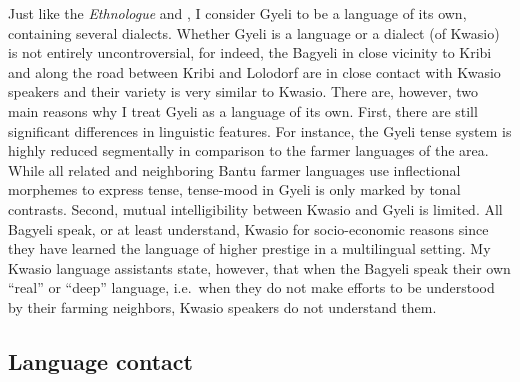 Just like the \textit{Ethnologue} and \citet{maho2009}, I consider Gyeli to be a language of its own, containing several dialects. Whether Gyeli is a language or a dialect (of Kwasio) is not entirely uncontroversial, for indeed, the Bagyeli in close vicinity to Kribi and along the road between Kribi and Lolodorf are in close contact with Kwasio speakers and their variety is very similar to Kwasio. There are, however, two main reasons why I treat Gyeli as a language of its own. First, there are still significant differences in linguistic features. For instance, the Gyeli tense system is highly reduced segmentally in comparison to the farmer languages of the area. While all related and neighboring Bantu farmer languages use inflectional morphemes to express tense, tense-mood in Gyeli is only marked by tonal contrasts.
 Second, mutual intelligibility between Kwasio and Gyeli is limited. All Bagyeli speak, or at least understand, Kwasio for socio-economic reasons since they have learned the language of higher prestige in a multilingual setting.  My Kwasio language assistants state, however, that when the Bagyeli speak their own ``real'' or ``deep'' language, i.e.\ when they do not make efforts to be understood by their farming neighbors, Kwasio speakers do not understand them.



\subsection{Language contact}
\label{sec:LangCon}




